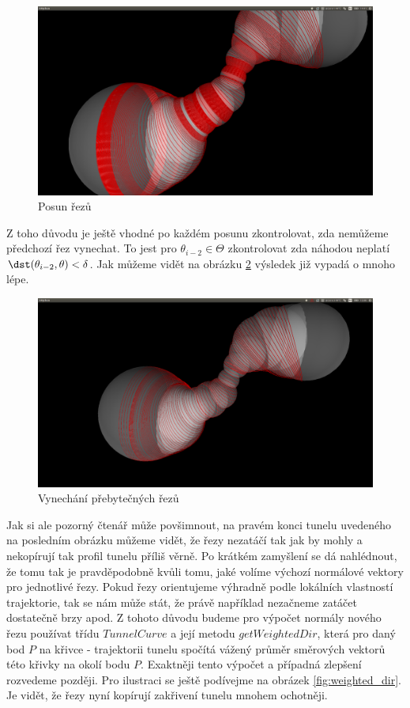 \begin{figure}
    \centering
    \includegraphics[width=\textwidth]{img/shift_cuts.png}
    \caption{Posun řezů}
  \centering
  \label{fig:shift_cuts}
\end{figure}

Z toho důvodu je ještě vhodné po každém posunu zkontrolovat, zda nemůžeme předchozí
řez vynechat. To jest pro $ \theta_{i - 2} \in \Theta $ zkontrolovat zda
náhodou neplatí $ \dst(\theta_{i - 2}, \theta) < \delta $. Jak můžeme vidět na
obrázku \ref{fig:cuts_with_replace} výsledek již vypadá o mnoho lépe.

\begin{figure}
    \centering
    \includegraphics[width=\textwidth]{img/cuts_with_replace.png}
    \caption{Vynechání přebytečných řezů}
  \centering
  \label{fig:cuts_with_replace}
\end{figure}

Jak si ale pozorný čtenář může povšimnout, na pravém konci tunelu uvedeného na
posledním obrázku můžeme vidět, že řezy nezatáčí tak jak by mohly a nekopírují tak
profil tunelu příliš věrně. Po krátkém zamyšlení se dá nahlédnout, že tomu tak
je pravděpodobně kvůli tomu, jaké volíme výchozí normálové vektory pro jednotlivé
řezy. Pokud řezy orientujeme výhradně podle lokálních vlastností trajektorie,
tak se nám může stát, že právě například nezačneme zatáčet dostatečně brzy apod.
Z tohoto důvodu budeme pro výpočet normály nového řezu používat třídu
$ TunnelCurve $ a její metodu $ getWeightedDir $, která pro daný bod $ P $ na křivce
- trajektorii tunelu spočítá vážený průměr směrových vektorů této křivky na
okolí bodu $ P $. Exaktněji tento výpočet a případná zlepšení rozvedeme později.
Pro ilustraci se ještě podívejme na obrázek \ref{fig:weighted_dir}. Je vidět, že
řezy nyní kopírují zakřivení tunelu mnohem ochotněji.

